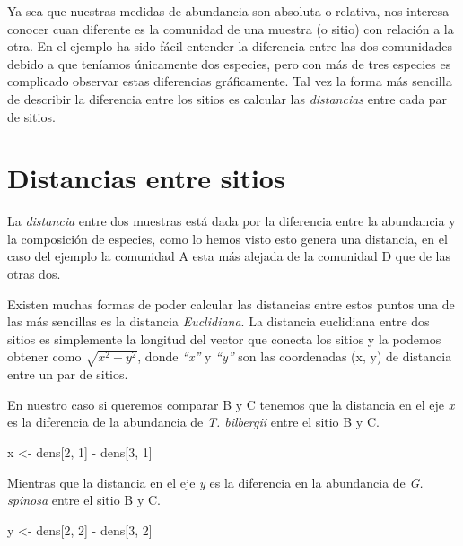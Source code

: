\documentclass[]{book}
\newenvironment{Shaded}{\begin{snugshade}}{\end{snugshade}}
\newcommand{\DecValTok}[1]{\textcolor[rgb]{0.00,0.00,0.81}{{#1}}}
\newcommand{\StringTok}[1]{\textcolor[rgb]{0.31,0.60,0.02}{{#1}}}
\newcommand{\NormalTok}[1]{{#1}}
\begin{document}
Ya sea que nuestras medidas de abundancia son absoluta o relativa, nos
interesa conocer cuan diferente es la comunidad de una muestra (o sitio)
con relación a la otra. En el ejemplo ha sido fácil entender la
diferencia entre las dos comunidades debido a que teníamos únicamente
dos especies, pero con más de tres especies es complicado observar estas
diferencias gráficamente. Tal vez la forma más sencilla de describir la
diferencia entre los sitios es calcular las \emph{distancias} entre cada
par de sitios.

\section{Distancias entre sitios}\label{distancias-entre-sitios}

La \emph{distancia} entre dos muestras está dada por la diferencia entre
la abundancia y la composición de especies, como lo hemos visto esto
genera una distancia, en el caso del ejemplo la comunidad A esta más
alejada de la comunidad D que de las otras dos.

Existen muchas formas de poder calcular las distancias entre estos
puntos una de las más sencillas es la distancia \emph{Euclidiana}. La
distancia euclidiana entre dos sitios es simplemente la longitud del
vector que conecta los sitios y la podemos obtener como
\(\sqrt{x^2+y^2}\), donde \emph{``x''} y \emph{``y''} son las
coordenadas (x, y) de distancia entre un par de sitios.

En nuestro caso si queremos comparar B y C tenemos que la distancia en
el eje \emph{x} es la diferencia de la abundancia de \emph{T. bilbergii}
entre el sitio B y C.

\begin{Shaded}
\begin{Highlighting}[]
\NormalTok{x <-}\StringTok{ }\NormalTok{dens[}\DecValTok{2}\NormalTok{, }\DecValTok{1}\NormalTok{] -}\StringTok{ }\NormalTok{dens[}\DecValTok{3}\NormalTok{, }\DecValTok{1}\NormalTok{]}
\end{Highlighting}
\end{Shaded}

Mientras que la distancia en el eje \emph{y} es la diferencia en la
abundancia de \emph{G. spinosa} entre el sitio B y C.

\begin{Shaded}
\begin{Highlighting}[]
\NormalTok{y <-}\StringTok{ }\NormalTok{dens[}\DecValTok{2}\NormalTok{, }\DecValTok{2}\NormalTok{] -}\StringTok{ }\NormalTok{dens[}\DecValTok{3}\NormalTok{, }\DecValTok{2}\NormalTok{]}
\end{Highlighting}
\end{Shaded}
\end{document}
